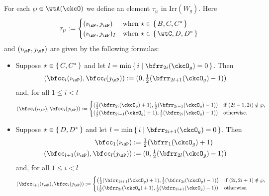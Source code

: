 \documentclass[12pt,a4paper]{amsart}
\numberwithin{equation}{section}
\theoremstyle{remark}
\def\half{{\tfrac{1}{2}}}
\def\Irr{\mathrm{Irr}}
\def\Wg{W_{g}}
\def\imathp{\imath_{\sP}}
\def\jmathp{\jmath_{\sP}}
\begin{document}
  For each $\wp\in \wtA(\ckcO)$ we define an element $\tau_{\wp}$ in
  $\Irr(\Wg)$. Here
  \[
    \tau_{\wp} :=
    \begin{cases}
      (\imathp,\jmathp) & \text{when } \star \in \set{B,C, C^{*} } \\
      (\imathp,\jmathp)_{I} & \text{when } \star \in \set{\wtC,D,D^{*}}
    \end{cases}
  \]
  and $(\imathp, \jmathp)$ are given by the following formulas:
  \begin{itemize}
    \item Suppose $\star\in \set{C,C^{*}}$ and let
          $l=\min\set{i| \bfrr_{2i}(\ckcO_{g})=0}$. Then
          \[
          (\bfcc_{l}(\imathp), \bfcc_{l}(\jmathp)) := (0,\half(\bfrr_{2l+1}(\ckcO_{g})-1))
          \]
          and, for all $1\leq i< l$
          \[
          (\bfcc_{i}(\imathp), \bfcc_{i}(\jmathp)):=
          \begin{cases}
            (\half (\bfrr_{2i}(\ckcO_{g})+1), \half (\bfrr_{2i-1}(\ckcO_{g})-1))
            & \text{if } (2i-1,2i)\notin \wp,\\
            (\half (\bfrr_{2i-1}(\ckcO_{g})+1),\half (\bfrr_{2i}(\ckcO_{g})-1)) & \text{otherwise.}
          \end{cases}
          \]
    \item Suppose $\star\in \set{D,D^{*}}$ and let
          $l=\min\set{i| \bfrr_{2i+1}(\ckcO_{g})=0}$. Then
          \[
          \begin{split}
            \bfcc_{1}(\imathp) &:=
            \half(\bfrr_{1}(\ckcO_{g})+1)\\
            (\bfcc_{l+1}(\imathp), \bfcc_{l}(\jmathp)) &:= (0,\half(\bfrr_{2l}(\ckcO_{g})-1))
          \end{split}
          \]
          and, for all $1\leq i<l$
          \[
          (\bfcc_{i+1}(\imathp), \bfcc_{i}(\jmathp)):=
          \begin{cases}
            \left(\half (\bfrr_{2i+1}(\ckcO_{g})+1), \half (\bfrr_{2i}(\ckcO_{g})-1)\right)
            & \text{if } (2i,2i+1)\notin \wp,\\
            (\half (\bfrr_{2i}(\ckcO_{g})+1),\half (\bfrr_{2i+1}(\ckcO_{g})-1)) & \text{otherwise.}
          \end{cases}
          \]


\end{itemize}
\end{document}
